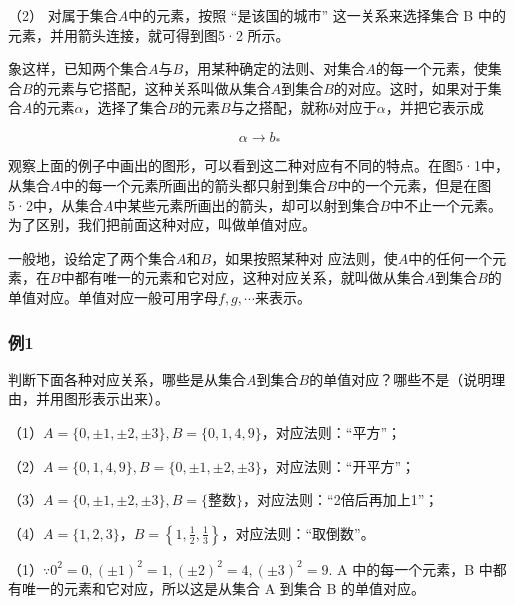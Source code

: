 （2） 对属于集合\(A\)中的元素，按照 ``是该国的城市'' 这一关系来选择集合
B 中的元素，并用箭头连接，就可得到图5·2 所示。

象这样，已知两个集合\(A\)与\(B\)，用某种确定的法则、对集合\(A\)的每一个元素，使集合\(B\)的元素与它搭配，这种关系叫做从集合\(A\)到集合\(B\)的对应。这时，如果对于集合\(A\)的元素\(\alpha\)，选择了集合\(B\)的元素\(B\)与之搭配，就称\(b\)对应于\(\alpha\)，并把它表示成

\[
\alpha \rightarrow b_{*}
\]

观察上面的例子中画出的图形，可以看到这二种对应有不同的特点。在图5·1中，从集合\(A\)中的每一个元素所画出的箭头都只射到集合\(B\)中的一个元素，但是在图5·2中，从集合\(A\)中某些元素所画出的箭头，却可以射到集合\(B\)中不止一个元素。为了区别，我们把前面这种对应，叫做单值对应。

一般地，设给定了两个集合\(A\)和\(B\)，如果按照某种对
应法则，使\(A\)中的任何一个元素，在\(B\)中都有唯一的元素和它对应，这种对应关系，就叫做从集合\(A\)到集合\(B\)的单值对应。单值对应一般可用字母\(f, g, \cdots\)来表示。

\subsubsection{例1}

判断下面各种对应关系，哪些是从集合\(A\)到集合\(B\)的单值对应？哪些不是（说明理由，并用图形表示出来）。

（1）\(A = \{0, \pm 1, \pm 2, \pm 3\}, B = \{0, 1, 4, 9\}\)，对应法则：``平方''；

（2）\(A = \{0, 1, 4, 9\}, B = \{0, \pm 1, \pm 2, \pm 3\}\)，对应法则：``开平方''；

（3）\(A = \{0, \pm 1, \pm 2, \pm 3\}, B = \{\text{整数}\}\)，对应法则：``2倍后再加上1''；

（4）\(A = \{1, 2, 3\}\)，\(B = \left\{1, \frac{1}{2}, \frac{1}{3}\right\}\)，对应法则：``取倒数''。


（1）\(\because 0^{2} = 0, (\pm 1)^{2} = 1, (\pm 2)^{2} = 4, (\pm 3)^{2} = 9.\)
A 中的每一个元素，B 中都有唯一的元素和它对应，所以这是从集合 A 到集合 B
的单值对应。

